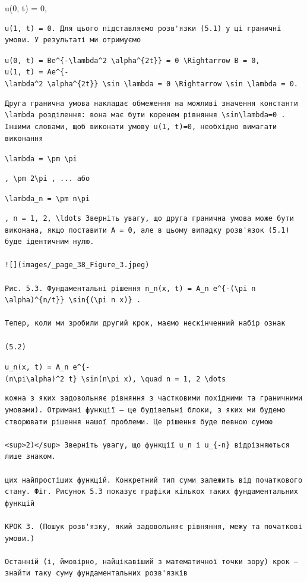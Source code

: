 \documentclass[
  ukrainian,
]{article}
\begin{document}
u(0, t) = 0,

\begin{verbatim}
u(1, t) = 0. Для цього підставляємо розв'язки (5.1) у ці граничні умови. У результаті ми отримуємо
\end{verbatim}

\texttt{u(0,\ t)\ =\ Be\^{}\{-\textbackslash{}lambda\^{}2\ \textbackslash{}alpha\^{}\{2t\}\}\ =\ 0\ \textbackslash{}Rightarrow\ B\ =\ 0,}
\texttt{u(1,\ t)\ =\ Ae\^{}\{-\textbackslash{}lambda\^{}2\ \textbackslash{}alpha\^{}\{2t\}\}\ \textbackslash{}sin\ \textbackslash{}lambda\ =\ 0\ \textbackslash{}Rightarrow\ \textbackslash{}sin\ \textbackslash{}lambda\ =\ 0.}

\begin{verbatim}
Друга гранична умова накладає обмеження на можливі значення константи \lambda розділення: вона має бути коренем рівняння \sin\lambda=0 . Іншими словами, щоб виконати умову u(1, t)=0, необхідно вимагати виконання
\end{verbatim}

\texttt{\textbackslash{}lambda\ =\ \textbackslash{}pm\ \textbackslash{}pi}

\begin{verbatim}
, \pm 2\pi , ... або
\end{verbatim}

\texttt{\textbackslash{}lambda\_n\ =\ \textbackslash{}pm\ n\textbackslash{}pi}

\begin{verbatim}
, n = 1, 2, \ldots Зверніть увагу, що друга гранична умова може бути виконана, якщо поставити A = 0, але в цьому випадку розв'язок (5.1) буде ідентичним нулю.

![](images/_page_38_Figure_3.jpeg)

Рис. 5.3. Фундаментальні рішення n_n(x, t) = A_n e^{-(\pi n \alpha)^{n/t}} \sin{(\pi n x)} .

Тепер, коли ми зробили другий крок, маємо нескінченний набір ознак

(5.2)
\end{verbatim}

\texttt{u\_n(x,\ t)\ =\ A\_n\ e\^{}\{-(n\textbackslash{}pi\textbackslash{}alpha)\^{}2\ t\}\ \textbackslash{}sin(n\textbackslash{}pi\ x),\ \textbackslash{}quad\ n\ =\ 1,\ 2\ \textbackslash{}dots}

\begin{verbatim}
кожна з яких задовольняє рівняння з частковими похідними та граничними умовами). Отримані функції — це будівельні блоки, з яких ми будемо створювати рішення нашої проблеми. Це рішення буде певною сумою

<sup>2)</sup> Зверніть увагу, що функції u_n і u_{-n} відрізняються лише знаком.

цих найпростіших функцій. Конкретний тип суми залежить від початкового стану. Фіг. Рисунок 5.3 показує графіки кількох таких фундаментальних функцій

КРОК 3. (Пошук розв'язку, який задовольняє рівняння, межу та початкові умови.)

Останній (і, ймовірно, найцікавіший з математичної точки зору) крок — знайти таку суму фундаментальних розв'язків
\end{verbatim}
\end{document}

